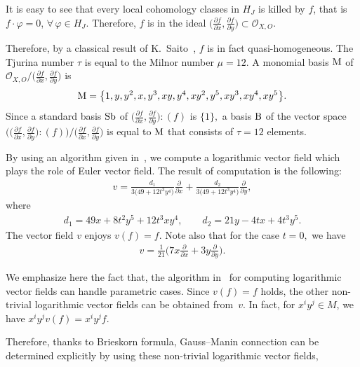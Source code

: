 \documentclass[pdftex]{sigma}%
\numberwithin{equation}{section}
\begin{document}
\begin{Example}
It is easy to see that every local cohomology classes in $H_J$ is killed by $f$, that is $ f\cdot \varphi =0$, $\forall\, \varphi \in H_J$. Therefore, $f$ is in the ideal $\big(\frac{\partial f}{\partial x}, \frac{\partial f}{\partial y}\big) \subset {\mathcal O}_{X,O}$.

Therefore, by a classical result of K.~Saito~\cite{S71}, $f$ is in fact quasi-homogeneous. The Tjurina number $\tau$ is equal to the Milnor number $\mu=12$.
A monomial basis ${\rm M}$ of $ {\mathcal O}_{X,O}/\big(\frac{\partial f}{\partial x}, \frac{\partial f}{\partial y}\big) $ is
\begin{gather*}
{\rm M} = \big\{1, y, y^2, x, y^3, xy, y^4, xy^2, y^5, xy^3, xy^4, xy^5 \big\}.
\end{gather*}
Since a standard basis ${\rm Sb} $ of $\big(\frac{\partial f}{\partial x}, \frac{\partial f}{\partial y}\big) : (f)$ is $\{1\},$ a basis ${\rm B}$ of the vector space
$ \big(\big(\frac{\partial f}{\partial x}, \frac{\partial f}{\partial y}\big) : (f)\big)/ \big(\frac{\partial f}{\partial x}, \frac{\partial f}{\partial y}\big)$ is
equal to ${\rm M}$ that consists of $\tau=12$ elements.

By using an algorithm given in~\cite{NT16b}, we compute a logarithmic vector field which plays the role of Euler vector field.
The result of computation is the following:
\begin{gather*}
v= \frac{d_1}{3\big(49+12t^3y^4\big)}\frac{\partial}{\partial x} + \frac{d_2}{3\big(49+12t^3y^4\big)}\frac{\partial}{\partial y},
\end{gather*}
where
\begin{gather*}
d_1=49x+8t^2y^5+12t^3xy^4, \qquad d_2=21y-4tx+4t^3y^5.
\end{gather*}
The vector field $ v$ enjoys $ v(f)=f$. Note also that for the case $ t=0, $ we have
\begin{gather*}
v= \frac{1}{21}\bigg(7x\frac{\partial}{\partial x} + 3y\frac{\partial}{\partial y}\bigg).
\end{gather*}

We emphasize here the fact that, the algorithm in~\cite{NT19a} for computing logarithmic vector fields can handle parametric cases.
Since $v(f)=f$ holds, the other non-trivial logarithmic vector fields can be obtained from~$v$.
In fact, for $x^i y^j \in M$, we have $x^i y^j v(f) = x^i y^j f$.

Therefore, thanks to Brieskorn formula, Gauss--Manin connection can be determined expli\-ci\-tly by using these non-trivial logarithmic vector fields,
\end{Example}
\end{document}
